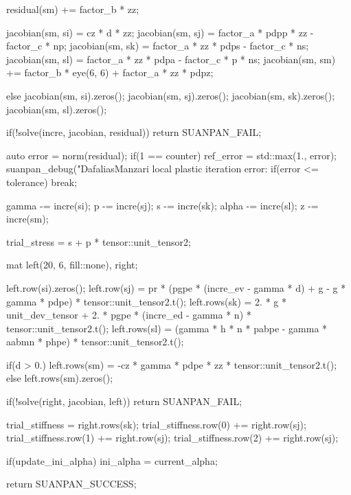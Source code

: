 \begin{cppcode}
{{{            residual(sm) += factor_b * zz;

            jacobian(sm, si) = cz * d * zz;
            jacobian(sm, sj) = factor_a * pdpp * zz - factor_c * np;
            jacobian(sm, sk) = factor_a * zz * pdps - factor_c * ns;
            jacobian(sm, sl) = factor_a * zz * pdpa - factor_c * p * ns;
            jacobian(sm, sm) += factor_b * eye(6, 6) + factor_a * zz * pdpz;
        }
        else {
            jacobian(sm, si).zeros();
            jacobian(sm, sj).zeros();
            jacobian(sm, sk).zeros();
            jacobian(sm, sl).zeros();
        }

        if(!solve(incre, jacobian, residual)) return SUANPAN_FAIL;

        auto error = norm(residual);
        if(1 == counter) ref_error = std::max(1., error);
        suanpan_debug("DafaliasManzari local plastic iteration error: %
        if(error <= tolerance) break;

        gamma -= incre(si);
        p -= incre(sj);
        s -= incre(sk);
        alpha -= incre(sl);
        z -= incre(sm);
    }

    trial_stress = s + p * tensor::unit_tensor2;

    mat left(20, 6, fill::none), right;

    left.row(si).zeros();
    left.row(sj) = pr * (pgpe * (incre_ev - gamma * d) + g - g * gamma * pdpe) * tensor::unit_tensor2.t();
    left.rows(sk) = 2. * g * unit_dev_tensor + 2. * pgpe * (incre_ed - gamma * n) * tensor::unit_tensor2.t();
    left.rows(sl) = (gamma * h * n * pabpe - gamma * aabmn * phpe) * tensor::unit_tensor2.t();

    if(d > 0.) left.rows(sm) = -cz * gamma * pdpe * zz * tensor::unit_tensor2.t();
    else left.rows(sm).zeros();

    if(!solve(right, jacobian, left)) return SUANPAN_FAIL;

    trial_stiffness = right.rows(sk);
    trial_stiffness.row(0) += right.row(sj);
    trial_stiffness.row(1) += right.row(sj);
    trial_stiffness.row(2) += right.row(sj);

    if(update_ini_alpha) ini_alpha = current_alpha;

    return SUANPAN_SUCCESS;
}
\end{cppcode}